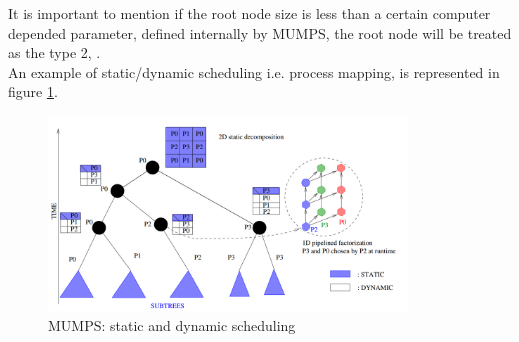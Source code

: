 It is important to mention if the root node size is less than a certain computer depended parameter, defined internally by MUMPS, the root node will be treated as the type 2, \cite{mumps-manual}.\\


An example of static/dynamic scheduling i.e. process mapping, is represented in figure \ref{fig:mumps:mapping-and-scheduling}.\\


\figpointer{\ref{fig:mumps:mapping-and-scheduling}}
\begin{figure}[htpb]
  \centering
  \includegraphics[width=0.85\textwidth]{figures/chapter-2/mumps-task-data-parallelism-2.png}
\caption{MUMPS: static and dynamic scheduling \cite{l2012multifrontal}}
\label{fig:mumps:mapping-and-scheduling}
\end{figure}


